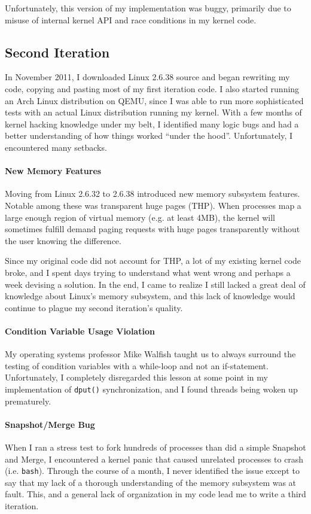 Unfortunately, this version of my implementation was buggy, primarily due to
misuse of internal kernel API and race conditions in my kernel code.

\subsection{Second Iteration}
In November 2011, I downloaded Linux 2.6.38 source and began rewriting my code,
copying and pasting most of my first iteration code. I also started running
an Arch Linux distribution on QEMU, since I was able to run more sophisticated
tests with an actual Linux distribution running my kernel. With a few months of
kernel hacking knowledge under my belt, I identified many logic bugs and had a
better understanding of how things worked ``under the hood''. Unfortunately, I
encountered many setbacks.

\paragraph{New Memory Features}
Moving from Linux 2.6.32 to 2.6.38 introduced new memory subsystem features.
Notable among these was transparent huge pages (THP). When processes map a large
enough region of virtual memory (e.g. at least 4MB), the kernel will sometimes
fulfill demand paging requests with huge pages transparently without the user
knowing the difference.

Since my original code did not account for THP, a lot of my existing kernel code
broke, and I spent days trying to understand what went wrong and perhaps a week
devising a solution. In the end, I came to realize I still lacked a great deal
of knowledge about Linux's memory subsystem, and this lack of knowledge would
continue to plague my second iteration's quality.

\paragraph{Condition Variable Usage Violation}
My operating systems professor Mike Walfish taught us to always surround
the testing of condition variables with a while-loop and not an if-statement.
Unfortunately, I completely disregarded this lesson at some point in my
implementation of {\tt dput()} synchronization, and I found threads being
woken up prematurely.

\paragraph{Snapshot/Merge Bug}
When I ran a stress test to fork hundreds of processes than did a simple
Snapshot and Merge, I encountered a kernel panic that caused unrelated processes
to crash (i.e. {\tt bash}). Through the course of a month, I never identified
the issue except to say that my lack of a thorough understanding of the memory
subsystem was at fault. This, and a general lack of organization in my code lead
me to write a third iteration.

